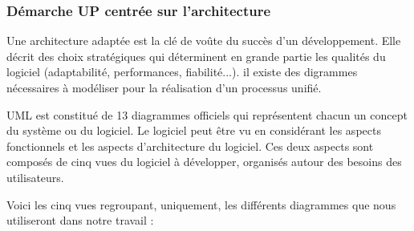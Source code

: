            \subsubsection[Démarche UP centrée sur l’architecture]{Démarche UP centrée sur l’architecture}
            Une architecture adaptée est la clé de voûte du succès d’un développement. Elle décrit
            des choix stratégiques qui déterminent en grande partie les qualités du logiciel (adaptabilité,
            performances, fiabilité...). \cite{diga2001uml}
            il existe des digrammes nécessaires à modéliser pour la réalisation d’un processus unifié.
            \par
            UML est constitué de 13 diagrammes officiels qui représentent chacun un concept du
            système ou du logiciel. Le logiciel peut être vu en considérant les aspects fonctionnels et
            les aspects d’architecture du logiciel. Ces deux aspects sont composés de cinq vues du
            logiciel à développer, organisés autour des besoins des utilisateurs.
            \par            
            Voici les cinq vues regroupant, uniquement, les différents diagrammes que nous
            utiliseront dans notre travail :
